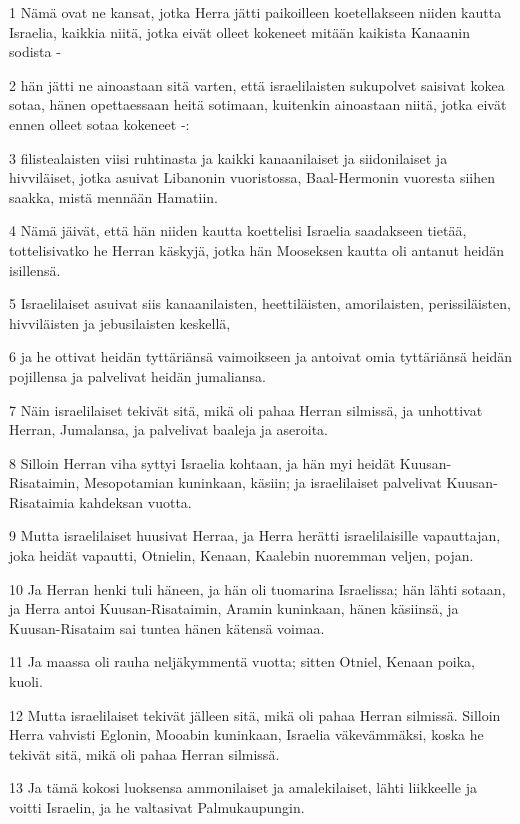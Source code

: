 \par 1 Nämä ovat ne kansat, jotka Herra jätti paikoilleen koetellakseen niiden kautta Israelia, kaikkia niitä, jotka eivät olleet kokeneet mitään kaikista Kanaanin sodista -
\par 2 hän jätti ne ainoastaan sitä varten, että israelilaisten sukupolvet saisivat kokea sotaa, hänen opettaessaan heitä sotimaan, kuitenkin ainoastaan niitä, jotka eivät ennen olleet sotaa kokeneet -:
\par 3 filistealaisten viisi ruhtinasta ja kaikki kanaanilaiset ja siidonilaiset ja hivviläiset, jotka asuivat Libanonin vuoristossa, Baal-Hermonin vuoresta siihen saakka, mistä mennään Hamatiin.
\par 4 Nämä jäivät, että hän niiden kautta koettelisi Israelia saadakseen tietää, tottelisivatko he Herran käskyjä, jotka hän Mooseksen kautta oli antanut heidän isillensä.
\par 5 Israelilaiset asuivat siis kanaanilaisten, heettiläisten, amorilaisten, perissiläisten, hivviläisten ja jebusilaisten keskellä,
\par 6 ja he ottivat heidän tyttäriänsä vaimoikseen ja antoivat omia tyttäriänsä heidän pojillensa ja palvelivat heidän jumaliansa.
\par 7 Näin israelilaiset tekivät sitä, mikä oli pahaa Herran silmissä, ja unhottivat Herran, Jumalansa, ja palvelivat baaleja ja aseroita.
\par 8 Silloin Herran viha syttyi Israelia kohtaan, ja hän myi heidät Kuusan-Risataimin, Mesopotamian kuninkaan, käsiin; ja israelilaiset palvelivat Kuusan-Risataimia kahdeksan vuotta.
\par 9 Mutta israelilaiset huusivat Herraa, ja Herra herätti israelilaisille vapauttajan, joka heidät vapautti, Otnielin, Kenaan, Kaalebin nuoremman veljen, pojan.
\par 10 Ja Herran henki tuli häneen, ja hän oli tuomarina Israelissa; hän lähti sotaan, ja Herra antoi Kuusan-Risataimin, Aramin kuninkaan, hänen käsiinsä, ja Kuusan-Risataim sai tuntea hänen kätensä voimaa.
\par 11 Ja maassa oli rauha neljäkymmentä vuotta; sitten Otniel, Kenaan poika, kuoli.
\par 12 Mutta israelilaiset tekivät jälleen sitä, mikä oli pahaa Herran silmissä. Silloin Herra vahvisti Eglonin, Mooabin kuninkaan, Israelia väkevämmäksi, koska he tekivät sitä, mikä oli pahaa Herran silmissä.
\par 13 Ja tämä kokosi luoksensa ammonilaiset ja amalekilaiset, lähti liikkeelle ja voitti Israelin, ja he valtasivat Palmukaupungin.
